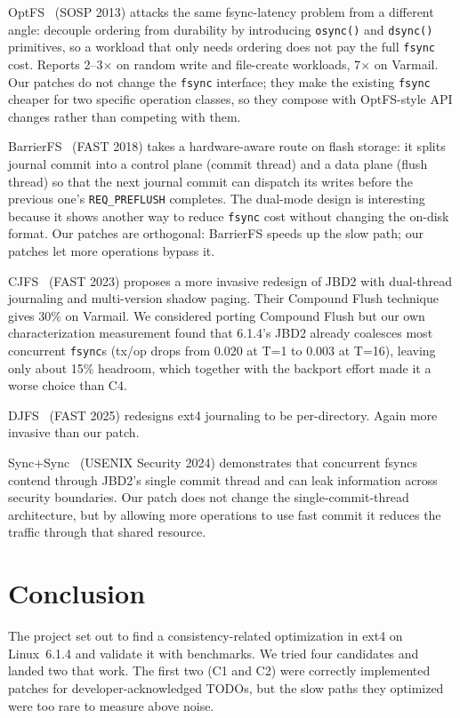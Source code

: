 \documentclass[11pt,a4paper]{article}
\begin{document}
OptFS~\cite{optfs} (SOSP 2013) attacks the same fsync-latency
problem from a different angle: decouple ordering from durability
by introducing \texttt{osync()} and \texttt{dsync()} primitives, so
a workload that only needs ordering does not pay the full
\texttt{fsync} cost. Reports 2--3$\times$ on random write and
file-create workloads, 7$\times$ on Varmail. Our patches do not
change the \texttt{fsync} interface; they make the existing
\texttt{fsync} cheaper for two specific operation classes, so
they compose with OptFS-style API changes rather than competing
with them.

BarrierFS~\cite{barrierfs} (FAST 2018) takes a hardware-aware route
on flash storage: it splits journal commit into a control plane
(commit thread) and a data plane (flush thread) so that the next
journal commit can dispatch its writes before the previous one's
\texttt{REQ\_PREFLUSH} completes. The dual-mode design is
interesting because it shows another way to reduce \texttt{fsync}
cost without changing the on-disk format. Our patches are
orthogonal: BarrierFS speeds up the slow path; our patches let more
operations bypass it.

CJFS~\cite{cjfs} (FAST 2023) proposes a more invasive redesign of
JBD2 with dual-thread journaling and multi-version shadow paging.
Their Compound Flush technique gives 30\% on Varmail. We considered
porting Compound Flush but our own characterization measurement
found that 6.1.4's JBD2 already coalesces most concurrent
\texttt{fsync}s (tx/op drops from 0.020 at T=1 to 0.003 at
T=16), leaving only about 15\% headroom, which together with the
backport effort made it a worse choice than C4.

DJFS~\cite{djfs} (FAST 2025) redesigns ext4 journaling to be
per-directory. Again more invasive than our patch.

Sync+Sync~\cite{syncsync} (USENIX Security 2024) demonstrates that
concurrent fsyncs contend through JBD2's single commit thread and
can leak information across security boundaries. Our patch does not
change the single-commit-thread architecture, but by allowing more
operations to use fast commit it reduces the traffic through that
shared resource.

\section{Conclusion}

The project set out to find a consistency-related optimization in
ext4 on Linux~6.1.4 and validate it with benchmarks. We tried four
candidates and landed two that work. The first two (C1 and C2) were
correctly implemented patches for developer-acknowledged TODOs, but
the slow paths they optimized were too rare to measure above noise.
\end{document}
